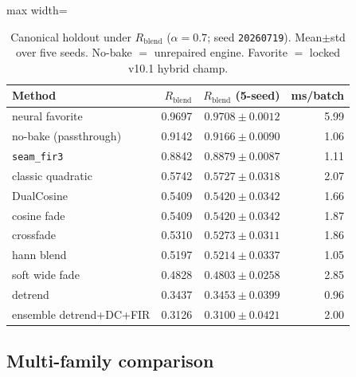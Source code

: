 \begin{table}[htbp]
  \centering
  \caption{Canonical holdout under $R_{\mathrm{blend}}$ ($\alpha{=}0.7$; seed \texttt{20260719}). Mean$\pm$std over five seeds. No-bake $=$ unrepaired engine. Favorite $=$ locked v10.1 hybrid champ.}
  \label{tab:canonical-methods}
  \setlength{\tabcolsep}{6pt}
  \begin{adjustbox}{max width=\columnwidth}
\begin{tabular}{@{}lrrr@{}}
    \toprule
    Method & $R_{\mathrm{blend}}$ & $R_{\mathrm{blend}}$ (5-seed) & ms/batch \\
    \midrule
    neural favorite & 0.9697 & $0.9708\pm0.0012$ & 5.99 \\
    no-bake (passthrough) & 0.9142 & $0.9166\pm0.0090$ & 1.06 \\
    \texttt{seam\_fir3} & 0.8842 & $0.8879\pm0.0087$ & 1.11 \\
    classic quadratic & 0.5742 & $0.5727\pm0.0318$ & 2.07 \\
    DualCosine & 0.5409 & $0.5420\pm0.0342$ & 1.66 \\
    cosine fade & 0.5409 & $0.5420\pm0.0342$ & 1.87 \\
    crossfade & 0.5310 & $0.5273\pm0.0311$ & 1.86 \\
    hann blend & 0.5197 & $0.5214\pm0.0337$ & 1.05 \\
    soft wide fade & 0.4828 & $0.4803\pm0.0258$ & 2.85 \\
    detrend & 0.3437 & $0.3453\pm0.0399$ & 0.96 \\
    ensemble detrend{+}DC{+}FIR & 0.3126 & $0.3100\pm0.0421$ & 2.00 \\
    \bottomrule
  \end{tabular}
\end{adjustbox}
\end{table}



\subsection{Multi-family comparison}
\label{sec:sota-main}

